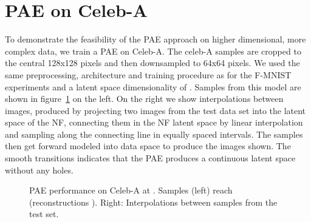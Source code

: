\documentclass[10pt]{article} \usepackage[accepted]{tmlr}
\newcommand{\rev}[1]{{\color{black}#1}}
\begin{document}
\section{PAE on Celeb-A}
\label{app:celba}
To demonstrate the feasibility of the PAE approach on higher dimensional, more complex data, we train a PAE on Celeb-A. The celeb-A samples are cropped to the central 128x128 pixels and then downsampled to 64x64 pixels. We used the same preprocessing, architecture and training procedure as for the F-MNIST experiments and a latent space dimensionality of . Samples from this model are shown in figure~\ref{fig:celeba_samples} on the left. On the right we show interpolations between images, produced by projecting two images from the test data set into the latent space of the NF, connecting them in the NF latent space by \rev{linear interpolation and sampling along the connecting line} in equally spaced intervals. The samples then get forward modeled into data space to produce the images shown. The smooth transitions indicates that the PAE produces a continuous latent space without any holes.  

\begin{figure}
\begin{subfigure}{0.4\textwidth}
\end{subfigure}
\begin{subfigure}{0.59\textwidth}
\end{subfigure}
\caption{PAE performance on Celeb-A at . Samples (left) reach  (reconstructions ). Right: Interpolations between samples from the test set.}
\label{fig:celeba_samples}
\end{figure}
\end{document}
